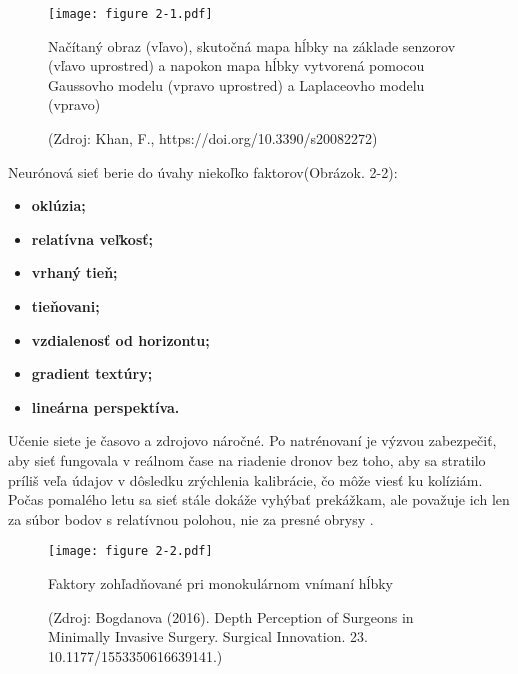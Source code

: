 \begin{figure}[ht!]
    \centering
    \texttt{[image: figure 2-1.pdf]}
    \caption{Načítaný obraz (vľavo), skutočná mapa hĺbky na základe senzorov (vľavo uprostred) a napokon mapa hĺbky vytvorená pomocou Gaussovho modelu (vpravo uprostred) a Laplaceovho modelu (vpravo)}
    \captionsetup{font=footnotesize, justification=centering, skip=5pt}
    \caption*{(Zdroj: Khan, F., https://doi.org/10.3390/s20082272)}
    \label{o:2-1}
\end{figure}

Neurónová sieť berie do úvahy niekoľko faktorov(Obrázok. 2-2):
\begin{itemize}
    \item \textbf{oklúzia;}
    \item \textbf{relatívna veľkosť;}
    \item \textbf{vrhaný tieň;}
    \item \textbf{tieňovani;}
    \item \textbf{vzdialenosť od horizontu;}
    \item \textbf{gradient textúry;}
    \item \textbf{lineárna perspektíva.}
\end{itemize}
Učenie siete je časovo a zdrojovo náročné. Po natrénovaní je výzvou zabezpečiť, aby sieť fungovala v reálnom čase na riadenie dronov bez toho, aby sa stratilo príliš veľa údajov v dôsledku zrýchlenia kalibrácie, čo môže viesť ku kolíziám. Počas pomalého letu sa sieť stále dokáže vyhýbať prekážkam, ale považuje ich len za súbor bodov s relatívnou polohou, nie za presné obrysy \citep{aabed2012depth}.

\begin{figure}[ht!]
    \centering
    \texttt{[image: figure 2-2.pdf]}
    \caption{Faktory zohľadňované pri monokulárnom vnímaní hĺbky}
    \captionsetup{font=footnotesize, justification=centering, skip=5pt}
    \caption*{(Zdroj: Bogdanova (2016). Depth Perception of Surgeons in Minimally Invasive Surgery. Surgical Innovation. 23. 10.1177/1553350616639141.)}
    \label{o:2-2}
\end{figure}

